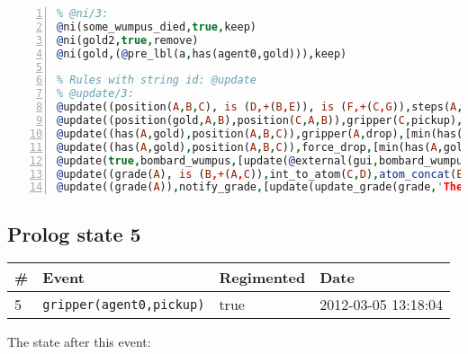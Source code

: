 \documentclass[11pt]{article}\usepackage[utf8]{inputenc}\usepackage{geometry}
\begin{document}
\begin{lstlisting}[language=Prolog, numbers=left]
% Rules with string id: @ni
% @ni/3:
@ni(some_wumpus_died,true,keep)
@ni(gold2,true,remove)
@ni(gold,(@pre_lbl(a,has(agent0,gold))),keep)

% Rules with string id: @update
% @update/3:
@update((position(A,B,C), is (D,+(B,E)), is (F,+(C,G)),steps(A,H), is (I,+(H,1.0))),move(A,E,G),[min(position(A,B,C)),plus(position(A,D,F)),min(steps(A,H)),plus(steps(A,I))|[]])
@update((position(gold,A,B),position(C,A,B)),gripper(C,pickup),[plus(has(C,gold)),min(position(gold,A,B))|[]])
@update((has(A,gold),position(A,B,C)),gripper(A,drop),[min(has(A,gold)),plus(position(gold,B,C))|[]])
@update((has(A,gold),position(A,B,C)),force_drop,[min(has(A,gold)),plus(position(gold,B,C)),update(@external(gui,gripper,D))|[]])
@update(true,bombard_wumpus,[update(@external(gui,bombard_wumpus,A)),min(alive(wumpus))|[]])
@update((grade(A), is (B,+(A,C)),int_to_atom(C,D),atom_concat(E,D,F)),update_grade(G,E,C),[min(grade(A)),plus(grade(B)),update(@external(gui,show_notice(G,F),H))|[]])
@update((grade(A)),notify_grade,[update(update_grade(grade,'The end result: ',A))|[]])

\end{lstlisting}
\clearpage 
\subsection{Prolog state 5}
\begin{table}[ht]
\centering 
\begin{tabular}{l l l l} 
\textbf{\#} & \textbf{Event} & \textbf{Regimented} & \textbf{Date} \\ [0.5ex] 
\hline
5&\texttt{gripper(agent0,pickup)}&true&2012-03-05 13:18:04\\ [1ex] \hline\end{tabular}
\end{table}
The state after this event:
\end{document}
